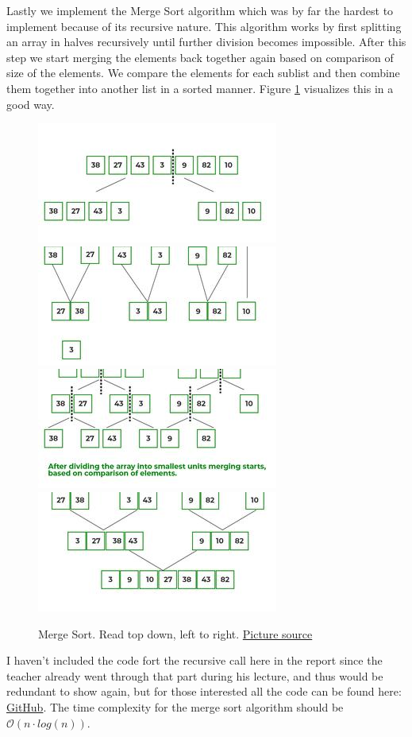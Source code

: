 \documentclass[a4paper,11pt]{article}
\begin{document}
Lastly we implement the Merge Sort algorithm which was by far the hardest to implement because of its recursive nature. This algorithm works by first splitting
an array in halves recursively until further division becomes impossible. After this step we start merging the elements back together again based on comparison
of size of the elements. We compare the elements for each sublist and then combine them together into another list in a sorted manner. Figure \ref{fig:mergeSort}
visualizes this in a good way.
\begin{figure}
    \includegraphics[width =.5\textwidth]{mergesort1.jpg}
    \includegraphics[width =.5\textwidth]{mergesort3.jpg}
    \includegraphics[width =.5\textwidth]{mergesort2.jpg}
    \includegraphics[width =.5\textwidth]{mergesort4.jpg}
    \caption{Merge Sort. Read top down, left to right. \href{https://www.geeksforgeeks.org/merge-sort/}{Picture source}}
    \label{fig:mergeSort}
\end{figure}
I haven't included the code fort the recursive call here in the report since the teacher already went through that part during his lecture, and thus would be
redundant to show again, but for those interested all the code can be found here: \href{https://github.com/adrian-jonsson-sjoedin/ID1021-AlgoData/blob/main/Tasks/Sorting/src}{GitHub}.
The time complexity for the merge sort algorithm should be $\mathcal{O}(n\cdot log(n))$.
\end{document}
